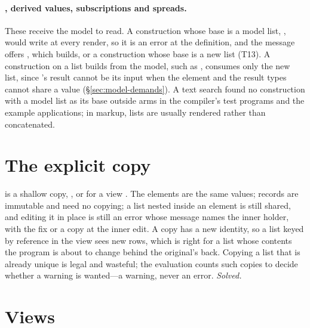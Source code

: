 \paragraph{, derived values, subscriptions and spreads.} These receive the model to read. A
construction whose base is a model list, , would write
 at every render, so it is an error at the definition, and the message offers
, which builds, or a construction whose base is a new
list (T13). A construction on a list  builds from the model, such as
, consumes only the new list, since 's result
cannot be its input when the element and the result types cannot share a value (\S\ref{sec:model-demands}).
A text search found no construction with a model list as its base outside  arms in the
compiler's test programs and the example applications; in markup, lists are usually rendered rather than
concatenated.

\section{The explicit copy}
\label{sec:hard-copy}

 is a shallow copy, , or for a view
. The elements are the same values; records are immutable and need no copying; a
list nested inside an element is still shared, and editing it in place is still an error whose message
names the inner holder, with the fix  or a copy at the inner edit. A copy has a
new identity, so a list keyed by reference in the view sees new rows, which is right for a list whose
contents the program is about to change behind the original's back. Copying a list that is already
unique is legal and wasteful; the evaluation counts such copies to decide whether a warning is
wanted---a warning, never an error. \emph{Solved.}

\section{Views}
\label{sec:hard-views}

